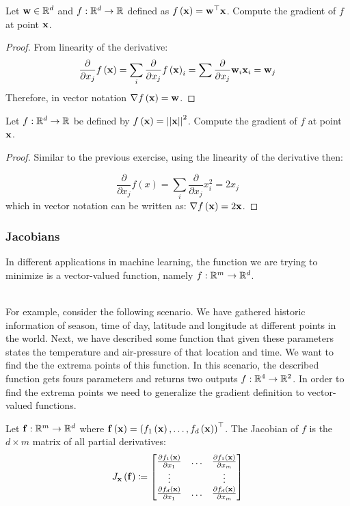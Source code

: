 \begin{exercise}\label{exe:linear_functional}
Let $\mathbf{w}\in\mathbb{R}^d$ and $f:\mathbb{R}^d\rightarrow\mathbb{R}$ defined as $f\left(\mathbf{x}\right)=\mathbf{w}^\top\mathbf{x}$. Compute the gradient of $f$ at point $\mathbf{x}$.
\end{exercise}
\begin{proof}
From linearity of the derivative:
$$ \frac{\partial}{\partial x_j}f\left(\mathbf{x}\right) = \sum_i \frac{\partial}{\partial x_j}f\left(\mathbf{x}\right)_i = \sum \frac{\partial}{\partial x_j} \mathbf{w}_i\mathbf{x}_i = \mathbf{w}_j  $$
Therefore, in vector notation $\nabla f\left(\mathbf{x}\right) = \mathbf{w}$.
\end{proof}

\begin{exercise}[Norm]\label{exe:grad_norm}
Let $f:\mathbb{R}^d\rightarrow\mathbb{R}$ be defined by $f\left(\mathbf{x}\right) = \left|\left| \mathbf{x}\right|\right|^2$. Compute the gradient of $f$ at point $\mathbf{x}$.
\end{exercise}
\begin{proof}
Similar to the previous exercise, using the linearity of the derivative then:

$$ \frac{\partial}{\partial x_j} f\left(x\right) = \sum_i \frac{\partial}{\partial x_j} x_i^2 = 2x_j $$
which in vector notation can be written as: $\nabla f\left(\mathbf{x}\right) = 2\mathbf{x}$.
\end{proof}


\subsubsection{Jacobians}
In different applications in machine learning, the function we are trying to minimize is a vector-valued function, namely $f:\mathbb{R}^m\rightarrow\mathbb{R}^d$. 

~\\ For example, consider the following scenario. We have gathered historic information of season, time of day, latitude and longitude at different points in the world. Next, we have described some function that given these parameters states the temperature and air-pressure of that location and time. We want to find the the extrema points of this function. In this scenario, the described function gets fours parameters and returns two outputs $f:\mathbb{R}^4\rightarrow\mathbb{R}^2$. In order to find the extrema points we need to generalize the gradient definition to vector-valued functions.
~\\
\begin{definition}[Jacobian]
	Let $\mathbf{f}:\mathbb{R}^m\rightarrow\mathbb{R}^d$ where $\mathbf{f}\left(\mathbf{x}\right)=\left(f_1\left(\mathbf{x}\right),\ldots, f_d\left(\mathbf{x}\right)\right)^\top$. The Jacobian of $f$ is the $d\times m$ matrix of all partial derivatives:
	\[
	J_{\mathbf{x}}\left(\mathbf{f}\right)\coloneqq\begin{bmatrix}\frac{\partial f_{1}\left(\mathbf{x}\right)}{\partial x_1} & \ldots & \frac{\partial f_1\left(\mathbf{x}\right)}{\partial x_m}\\
		\vdots &  & \vdots\\
		\frac{\partial f_d\left(\mathbf{x}\right)}{\partial x_1} & \ldots & \frac{\partial f_d\left(\mathbf{x}\right)}{\partial x_m}
	\end{bmatrix}
	\]
\end{definition}

